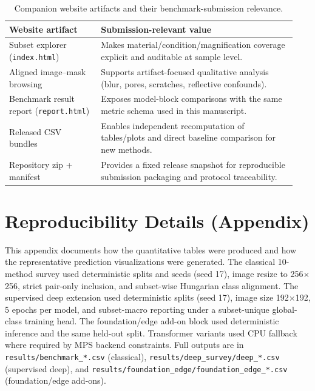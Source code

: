 \documentclass{article}
\newcommand{\tablefontsize}{\small}
\begin{document}
\begin{table}[ht]
    \centering
    \tablefontsize
    \caption{Companion website artifacts and their benchmark-submission relevance.}
    \label{tab:website_artifacts}
    \begin{tabular}{p{0.30\linewidth}p{0.64\linewidth}}
        \toprule
        Website artifact & Submission-relevant value \\
        \midrule
        Subset explorer (\texttt{index.html}) & Makes material/condition/magnification coverage explicit and auditable at sample level. \\
        Aligned image--mask browsing & Supports artifact-focused qualitative analysis (blur, pores, scratches, reflective confounds). \\
        Benchmark result report (\texttt{report.html}) & Exposes model-block comparisons with the same metric schema used in this manuscript. \\
        Released CSV bundles & Enables independent recomputation of tables/plots and direct baseline comparison for new methods. \\
        Repository zip + manifest & Provides a fixed release snapshot for reproducible submission packaging and protocol traceability. \\
        \bottomrule
    \end{tabular}
\end{table}

\section{Reproducibility Details (Appendix)}
This appendix documents how the quantitative tables were produced and how the representative prediction visualizations were generated. The classical 10-method survey used deterministic splits and seeds (seed 17), image resize to 256$\times$256, strict pair-only inclusion, and subset-wise Hungarian class alignment. The supervised deep extension used deterministic splits (seed 17), image size 192$\times$192, 5 epochs per model, and subset-macro reporting under a subset-unique global-class training head. The foundation/edge add-on block used deterministic inference and the same held-out split. Transformer variants used CPU fallback where required by MPS backend constraints. Full outputs are in \texttt{results/benchmark\_*.csv} (classical), \texttt{results/deep\_survey/deep\_*.csv} (supervised deep), and \texttt{results/foundation\_edge/foundation\_edge\_*.csv} (foundation/edge add-ons).
\end{document}
